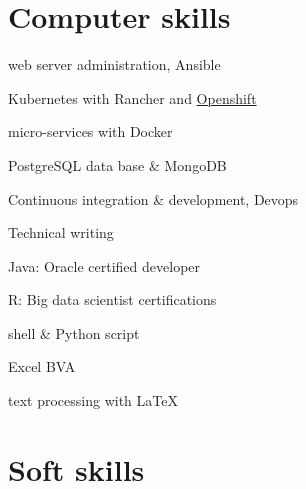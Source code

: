 \section{Computer skills}

\begin{multicols}{2}
\begin{itemize}
  {
     \item[\faCaretRight]  web server administration, Ansible
     \item[\faCaretRight]  Kubernetes with Rancher and \href{https://www.openshift.com/}{Openshift}
     \item[\faCaretRight]  micro-services with Docker
     \item[\faCaretRight]  PostgreSQL data base \& MongoDB
	 \item[\faCaretRight]  Continuous integration \& development, Devops
	 \item[\faCaretRight]  Technical writing
   }
\end{itemize}
\end{multicols}

\vspace{-\baselineskip}
\begin{multicols}{2}
\begin{itemize}

  {
     \item[\faTerminal]  Java: Oracle certified developer
     \item[\faTerminal]  R: Big data scientist certifications
     \item[\faTerminal]  shell \& Python script
     \item[\faTerminal]  Excel BVA
     \item[\faTerminal]  text processing with \LaTeX
     }
\end{itemize}
\end{multicols}


\section{Soft skills}

